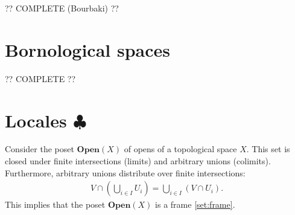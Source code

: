     ?? COMPLETE (Bourbaki) ??

\section{Bornological spaces}


    ?? COMPLETE ??

\section{\texorpdfstring{Locales $\clubsuit$}{Locales}}

    \begin{property}
        Consider the poset $\mathbf{Open}(X)$ of opens of a topological space $X$. This set is closed under finite intersections (limits) and arbitrary unions (colimits). Furthermore, arbitrary unions distribute over finite intersections:
        \begin{gather}
            V\cap\left(\bigcup_{i\in I}U_i\right) = \bigcup_{i\in I}\left(V\cap U_i\right).
        \end{gather}
        This implies that the poset $\mathbf{Open}(X)$ is a frame \ref{set:frame}.
    \end{property}

